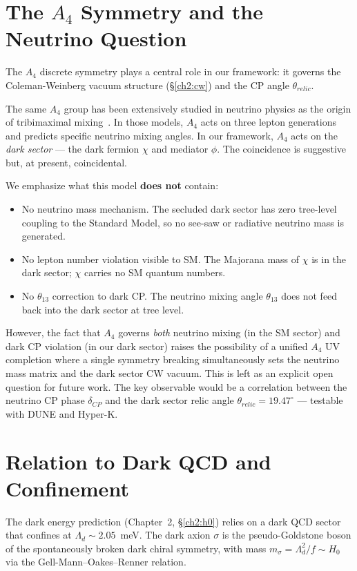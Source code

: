 \section{The $A_4$ Symmetry and the Neutrino Question}
\label{disc:neutrino}

The $A_4$ discrete symmetry plays a central role in our framework: it governs
the Coleman-Weinberg vacuum structure (§\ref{ch2:cw}) and the CP angle
$\theta_{relic}$.

The same $A_4$ group has been extensively studied in neutrino physics as the
origin of tribimaximal mixing~\cite{Ma2001,AltarelliFeruglio2005}. In those
models, $A_4$ acts on three lepton generations and predicts specific neutrino
mixing angles. In our framework, $A_4$ acts on the \emph{dark sector} — the
dark fermion $\chi$ and mediator $\phi$. The coincidence is suggestive but,
at present, coincidental.

We emphasize what this model \textbf{does not} contain:
\begin{itemize}
\item No neutrino mass mechanism. The secluded dark sector has zero tree-level
      coupling to the Standard Model, so no see-saw or radiative neutrino
      mass is generated.
\item No lepton number violation visible to SM. The Majorana mass of $\chi$
      is in the dark sector; $\chi$ carries no SM quantum numbers.
\item No $\theta_{13}$ correction to dark CP. The neutrino mixing angle
      $\theta_{13}$ does not feed back into the dark sector at tree level.
\end{itemize}

However, the fact that $A_4$ governs \emph{both} neutrino mixing (in the SM
sector) and dark CP violation (in our dark sector) raises the possibility of
a unified $A_4$ UV completion where a single symmetry breaking simultaneously
sets the neutrino mass matrix and the dark sector CW vacuum. This is left
as an explicit open question for future work. The key observable would be a
correlation between the neutrino CP phase $\delta_{CP}$ and the dark sector
relic angle $\theta_{relic} = 19.47^\circ$ — testable with DUNE and Hyper-K.


\section{Relation to Dark QCD and Confinement}
\label{disc:darkqcd}

The dark energy prediction (Chapter~2, §\ref{ch2:h0}) relies on a dark QCD
sector that confines at $\Lambda_d \sim 2.05$~meV. The dark axion $\sigma$ is
the pseudo-Goldstone boson of the spontaneously broken dark chiral symmetry,
with mass $m_\sigma = \Lambda_d^2/f \sim H_0$ via the Gell-Mann--Oakes--Renner
relation.

